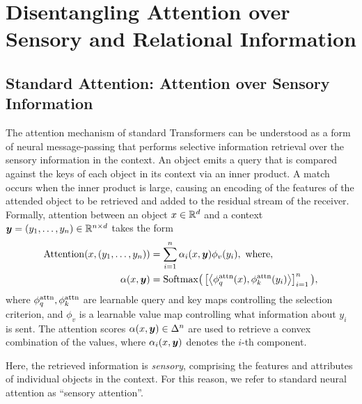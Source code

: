 \section{Disentangling Attention over Sensory and Relational Information}

\subsection{Standard Attention: Attention over Sensory Information}

The attention mechanism of standard Transformers can be understood as a form of neural message-passing that performs selective information retrieval over the sensory information in the context. An object emits a query that is compared against the keys of each object in its context via an inner product. A match occurs when the inner product is large, causing an encoding of the features of the attended object to be retrieved and added to the residual stream of the receiver. Formally, attention between an object $x \in \mathbb{R}^d$ and a context $\bm{y} = (y_1, \ldots, y_n) \in \mathbb{R}^{n \times d}$ takes the form
\begin{equation}\label{eq:self_attn}
  \begin{split}
    \Attn(x, \ys) &= \sum_{i=1}^{n} \alpha_i(x, \y) \phi_v(y_i), \ \text{where}, \\
    \alpha(x, \y) &= \Softmax\bigparen{\bra{\iprod{\phiqattn(x)}{\phikattn(y_i)}}_{i=1}^{n}},
  \end{split}
\end{equation}
where $\phi_q^{\mathrm{attn}},\phi_k^{\mathrm{attn}}$ are learnable query and key maps controlling the selection criterion, and $\phi_v$ is a learnable value map controlling what information about $y_i$ is sent. The attention scores $\alpha(x, \bm{y}) \in \Delta^n$ are used to retrieve a convex combination of the values, where $\alpha_i(x, \bm{y})$ denotes the $i$-th component.

Here, the retrieved information is \textit{sensory}, comprising the features and attributes of individual objects in the context. For this reason, we refer to standard neural attention as ``sensory attention''.



